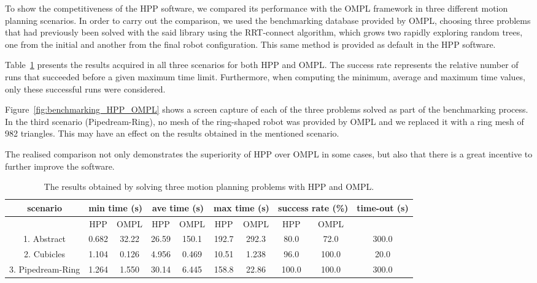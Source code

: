 \documentclass{article}
\begin{document}
To show the competitiveness of the HPP software, we compared its performance with the OMPL framework in three different motion planning scenarios. In order to carry out the comparison, we used the benchmarking database provided by OMPL, choosing three problems that had previously been solved with the said library using the RRT-connect algorithm, which grows two rapidly exploring random trees, one from the initial and another from the final robot configuration. This same method is provided as default in the HPP software.

Table~\ref{table:benchmarking_HPP_OMPL} presents the results acquired in all three scenarios for both HPP and OMPL. The success rate represents the relative number of runs that succeeded before a given maximum time limit. Furthermore, when computing the minimum, average and maximum time values, only these successful runs were considered.

Figure~\ref{fig:benchmarking_HPP_OMPL} shows a screen capture of each of the three problems solved as part of the benchmarking process. In the third scenario (Pipedream-Ring), no mesh of the ring-shaped robot was provided by OMPL and we replaced it with a ring mesh of 982 triangles. This may have an effect on the results obtained in the mentioned scenario.

The realised comparison not only demonstrates the superiority of HPP over OMPL in some cases, but also that there is a great incentive to further improve the software.

\begin{table}
  \begin{center}
    \begin{tabular}{ c| c| c| c| c| c| c| c| c| c }
scenario & \multicolumn{2}{c|}{min time (s)} & \multicolumn{2}{c|}{ave time (s)} & \multicolumn{2}{c|}{max time (s)} & \multicolumn{2}{c|}{success rate (\%)} & time-out (s) \\
\hline
  &  HPP & OMPL & HPP & OMPL & HPP & OMPL & HPP & OMPL \\
\hline
1. Abstract & 0.682 & 32.22 & 26.59 & 150.1 & 192.7 & 292.3 & 80.0 & 72.0 & 300.0\\
2. Cubicles & 1.104 & 0.126 & 4.956 & 0.469 & 10.51 & 1.238 & 96.0 & 100.0 & 20.0\\
3. Pipedream-Ring & 1.264 & 1.550 & 30.14 & 6.445 & 158.8 & 22.86 & 100.0 & 100.0 & 300.0\\
    \end{tabular}
  \end{center}
\caption{The results obtained by solving three motion planning problems with HPP and OMPL.}
  \label{table:benchmarking_HPP_OMPL}
\end{table}
\end{document}
